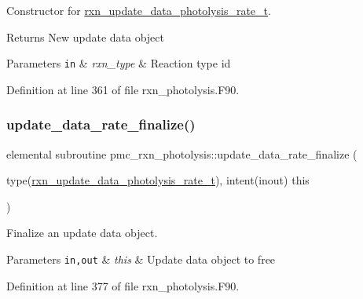 Constructor for \mbox{\hyperlink{structpmc__rxn__photolysis_1_1rxn__update__data__photolysis__rate__t}{rxn\+\_\+update\+\_\+data\+\_\+photolysis\+\_\+rate\+\_\+t}}. 

\begin{DoxyReturn}{Returns}
New update data object
\end{DoxyReturn}

\begin{DoxyParams}[1]{Parameters}
\mbox{\tt in}  & {\em rxn\+\_\+type} & Reaction type id \\
\hline
\end{DoxyParams}


Definition at line 361 of file rxn\+\_\+photolysis.\+F90.

\mbox{\label{namespacepmc__rxn__photolysis_afc60a7f115d5014f760edaf1fefe8c24}} 
\subsubsection{\texorpdfstring{update\+\_\+data\+\_\+rate\+\_\+finalize()}{update\_data\_rate\_finalize()}}
{\footnotesize\ttfamily elemental subroutine pmc\+\_\+rxn\+\_\+photolysis\+::update\+\_\+data\+\_\+rate\+\_\+finalize (\begin{DoxyParamCaption}\item[{type(\mbox{\hyperlink{structpmc__rxn__photolysis_1_1rxn__update__data__photolysis__rate__t}{rxn\+\_\+update\+\_\+data\+\_\+photolysis\+\_\+rate\+\_\+t}}), intent(inout)}]{this }\end{DoxyParamCaption})\hspace{0.3cm}{\ttfamily [private]}}



Finalize an update data object. 


\begin{DoxyParams}[1]{Parameters}
\mbox{\tt in,out}  & {\em this} & Update data object to free \\
\hline
\end{DoxyParams}


Definition at line 377 of file rxn\+\_\+photolysis.\+F90.

\mbox{\label{namespacepmc__rxn__photolysis_a83d27d14ea7ff279329cc7cad6cd616c}} 
